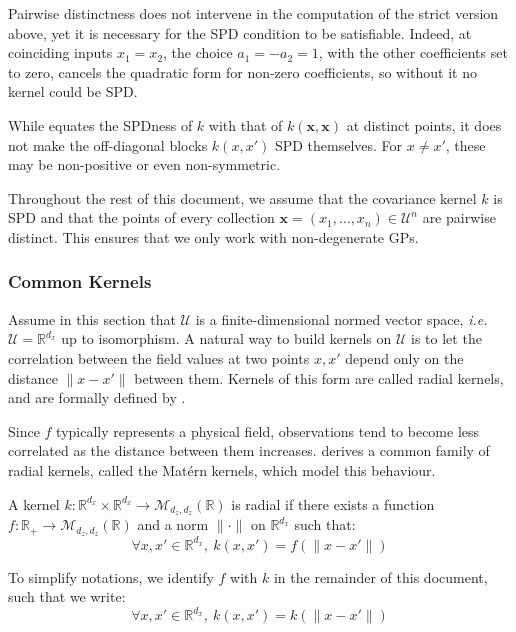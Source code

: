 \begin{remark}
	Pairwise distinctness does not intervene in the computation of the strict version above, yet it is necessary for the SPD condition to be satisfiable. Indeed, at coinciding inputs $x_1=x_2$, the choice $a_1=-a_2=1$, with the other coefficients set to zero, cancels the quadratic form for non-zero coefficients, so without it no kernel could be SPD.
\end{remark}

\begin{remark}
	While  equates the SPDness of $k$ with that of $k(\mathbf{x},\mathbf{x})$ at distinct points, it does not make the off-diagonal blocks $k(x,x')$ SPD themselves. For $x\neq x'$, these may be non-positive or even non-symmetric.
\end{remark}

Throughout the rest of this document, we assume that the covariance kernel $k$ is SPD and that the points of every collection $\mathbf{x}=(x_1,\dots,x_n)\in\mathcal{U}^n$ are pairwise distinct. This ensures that we only work with non-degenerate GPs.

\subsubsection{Common Kernels}

Assume in this section that $\mathcal{U}$ is a finite-dimensional normed vector space, \textit{i.e.} $\mathcal{U}=\mathbb{R}^{d_x}$ up to isomorphism. A natural way to build kernels on $\mathcal{U}$ is to let the correlation between the field values at two points $x,x'$ depend only on the distance $\|x-x'\|$ between them. Kernels of this form are called radial kernels, and are formally defined by .

Since $f$ typically represents a physical field, observations tend to become less correlated as the distance between them increases.  derives a common family of radial kernels, called the Matérn kernels, which model this behaviour.

\begin{definition}\label{th:radial_kernel}
	A kernel $k:\mathbb{R}^{d_x}\times\mathbb{R}^{d_x}\to\mathcal{M}_{d_z,d_z}(\mathbb{R})$ is radial if there exists a function $f:\mathbb{R}_+\to\mathcal{M}_{d_z,d_z}(\mathbb{R})$ and a norm $\|\cdot\|$ on $\mathbb{R}^{d_x}$ such that:
	\begin{equation}
		\forall x,x'\in\mathbb{R}^{d_x},\:k(x,x')=f(\|x-x'\|)
	\end{equation}

	To simplify notations, we identify $f$ with $k$ in the remainder of this document, such that we write:
	\begin{equation}
		\forall x,x'\in\mathbb{R}^{d_x},\:k(x,x')=k(\|x-x'\|)
	\end{equation}
\end{definition}

